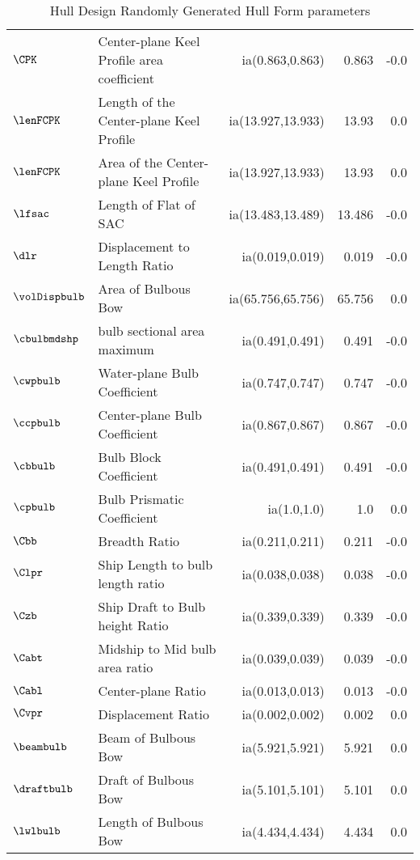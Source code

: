 \begin{small}
\begin{table}
{\begin{tabular}{llrrr}
			$\CPK$  	& Center-plane Keel Profile area coefficient& ia(0.863,0.863) & 0.863 	&   -0.0        	\\
			$\lenFCPK$  & Length of the Center-plane Keel Profile 	& ia(13.927,13.933) & 13.93 	&   0.0        	\\
			$\lenFCPK$  & Area of the Center-plane Keel Profile 	& ia(13.927,13.933) & 13.93 	&   0.0       	\\
			$\lfsac$  	& Length of Flat of SAC  					& ia(13.483,13.489)	& 13.486 	&   -0.0           \\
			$\dlr$  	& Displacement to Length Ratio 				& ia(0.019,0.019) & 0.019 	&   -0.0           \\
			$\volDispbulb$  & Area of Bulbous Bow 				& ia(65.756,65.756) & 65.756 	&   0.0           \\
			$\cbulbmdshp$  	& bulb sectional area maximum 		& ia(0.491,0.491) & 0.491 	&   -0.0           \\
			$\cwpbulb$  	& Water-plane Bulb Coefficient  	& ia(0.747,0.747)	& 0.747 	&   -0.0           \\
			$\ccpbulb$  	& Center-plane Bulb Coefficient  	& ia(0.867,0.867) & 0.867 	&   -0.0           \\
			$\cbbulb$  		& Bulb Block Coefficient  			& ia(0.491,0.491)	& 0.491 	&   -0.0           \\
			$\cpbulb$  		& Bulb Prismatic Coefficient    	& ia(1.0,1.0) & 1.0 	&   0.0           \\
			$\Cbb$  		& Breadth Ratio 					& ia(0.211,0.211) & 0.211 	&   -0.0           \\
			$\Clpr$  		& Ship Length to bulb length ratio  & ia(0.038,0.038) & 0.038 	&   -0.0           \\
			$\Czb$  		& Ship Draft to Bulb height Ratio  	& ia(0.339,0.339) & 0.339 	&   -0.0           \\
			$\Cabt$  		& Midship to Mid bulb area ratio    & ia(0.039,0.039)	& 0.039 	&   -0.0           \\
			$\Cabl$  		& Center-plane Ratio  				& ia(0.013,0.013)	& 0.013 	&   -0.0           \\
			$\Cvpr$  		& Displacement Ratio   				& ia(0.002,0.002) & 0.002 	&   0.0           \\
			$\beambulb$  	& Beam of Bulbous Bow 				& ia(5.921,5.921) & 5.921 	&   0.0           \\
			$\draftbulb$  	& Draft of Bulbous Bow 				& ia(5.101,5.101) & 5.101 	&   0.0           \\
			$\lwlbulb$  	& Length of Bulbous Bow 			& ia(4.434,4.434) & 4.434 	&   0.0           \\
			\bottomrule
		\end{tabular}
		}
		\caption{Hull Design Randomly Generated Hull Form parameters}
		\label{tbl:1_logic2fpdcompare}
	\end{table}
\end{small}
